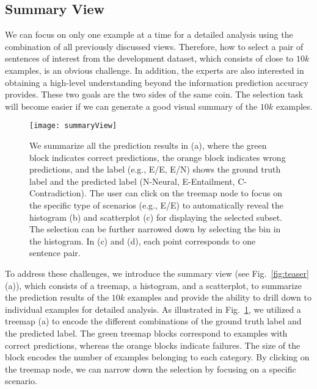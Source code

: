 

\subsection{Summary View}
\label{sec:allPairs}
We can focus on only one example at a time for a detailed analysis using the combination of all previously discussed views. Therefore, how to select a pair of sentences of interest from the development dataset, which consists of close to $10k$ examples, is an obvious challenge.
In addition, the experts are also interested in obtaining a high-level understanding beyond the information prediction accuracy provides.%
%
These two goals are the two sides of the same coin. 
The selection task will become easier if we can generate a good visual summary of the $10k$ examples.%

\begin{figure}[htbp]
\centering
\vspace{-2mm}
 \texttt{[image: summaryView]}
 \vspace{-6mm}
 \caption{
We summarize all the prediction results in (a), where the green block indicates correct predictions, the orange block indicates wrong predictions, and the label (e.g., E/E, E/N) shows the ground truth label and the predicted label (N-Neural, E-Entailment, C-Contradiction).
%
The user can click on the treemap node to focus on the specific type of scenarios (e.g., E/E) to automatically reveal the histogram (b) and scatterplot (c) for displaying the selected subset.
The selection can be further narrowed down by selecting the bin in the histogram.
In (c) and (d), each point corresponds to one sentence pair.
 }
 \vspace{-2mm}
\label{fig:summaryView}
\end{figure}

To address these challenges, we introduce the summary view (see Fig.~\ref{fig:teaser}(a)), which consists of a treemap, a histogram, and a scatterplot, to summarize the prediction results of the $10k$ examples and provide the ability to drill down to individual examples for detailed analysis.
As illustrated in Fig.~\ref{fig:summaryView}, we utilized a treemap (a) to encode the different combinations of the ground truth label and the predicted label. The green treemap blocks correspond to examples with correct predictions, whereas the orange blocks indicate failures. The size of the block encodes the number of examples belonging to each category.
%
By clicking on the treemap node, we can narrow down the selection by focusing on a specific scenario.

